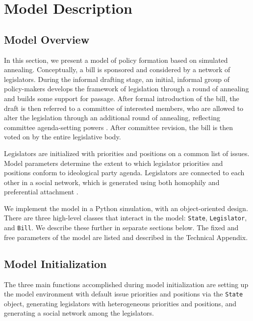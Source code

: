 \documentclass[pdftex,12pt]{llncs}
\begin{document}
\section{Model Description}

\subsection{Model Overview}
In this section, we present a model of policy formation based on simulated annealing. 
Conceptually, a bill is sponsored and considered by a network of legislators. 
During the informal drafting stage, an initial, informal group of policy-makers develops the framework of legislation through a round of annealing and builds some support for passage. 
After formal introduction of the bill, the draft is then referred to a committee of interested members, who are allowed to alter the legislation through an additional round of annealing, reflecting committee agenda-setting powers \parencite{cm93, cm05}.  After committee revision, the bill is then voted on by the entire legislative body.

Legislators are initialized with priorities and positions on a common list of issues. Model parameters determine the extent to which legislator priorities and positions conform to ideological party agenda.  Legislators are connected to each other in a social network, which is generated using both homophily \parencite{msc01, br11} and preferential attachment \parencite{Barabasi1999}.

We implement the model in a Python simulation, with an object-oriented design. 
There are three high-level classes that interact in the model: \texttt{State}, \texttt{Legislator}, and \texttt{Bill}.  
We describe these further in separate sections below.
The fixed and free parameters of the model are listed and described in the Technical Appendix.

\subsection{Model Initialization} 
The three main functions accomplished during model initialization are setting up the model environment with default issue priorities and positions via the \texttt{State} object, generating legislators with heterogeneous priorities and positions, and generating a social network among the legislators.
\end{document}

